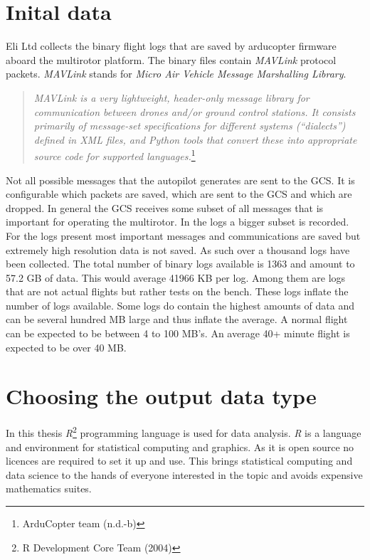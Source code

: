 \documentclass[12pt,oneside]{reedthesis}
\theoremstyle{definition}
\theoremstyle{definition}
\theoremstyle{definition}
\theoremstyle{remark}
\begin{document}
\section{Inital data}\label{inital-data}

Eli Ltd collects the binary flight logs that are saved by arducopter
firmware aboard the multirotor platform. The binary files contain
\emph{MAVLink} protocol packets. \emph{MAVLink} stands for \emph{Micro
Air Vehicle Message Marshalling Library}.
\begin{quote}
\emph{MAVLink is a very lightweight, header-only message library for
communication between drones and/or ground control stations. It consists
primarily of message-set specifications for different systems
(``dialects'') defined in XML files, and Python tools that convert these
into appropriate source code for supported languages.}\footnote{ArduCopter
  team (n.d.-b)}
\end{quote}
Not all possible messages that the autopilot generates are sent to the
GCS. It is configurable which packets are saved, which are sent to the
GCS and which are dropped. In general the GCS receives some subset of
all messages that is important for operating the multirotor. In the logs
a bigger subset is recorded. For the logs present most important
messages and communications are saved but extremely high resolution data
is not saved. As such over a thousand logs have been collected. The
total number of binary logs available is 1363 and amount to 57.2 GB of
data. This would average 41966 KB per log. Among them are logs that are
not actual flights but rather tests on the bench. These logs inflate the
number of logs available. Some logs do contain the highest amounts of
data and can be several hundred MB large and thus inflate the average. A
normal flight can be expected to be between 4 to 100 MB's. An average
40+ minute flight is expected to be over 40 MB.

\hypertarget{choosing-the-output-data-type}{\section{Choosing the output
data type}\label{choosing-the-output-data-type}}

In this thesis \emph{R}\footnote{R Development Core Team (2004)}
programming language is used for data analysis. \emph{R} is a language
and environment for statistical computing and graphics. As it is open
source no licences are required to set it up and use. This brings
statistical computing and data science to the hands of everyone
interested in the topic and avoids expensive mathematics suites.
\end{document}
